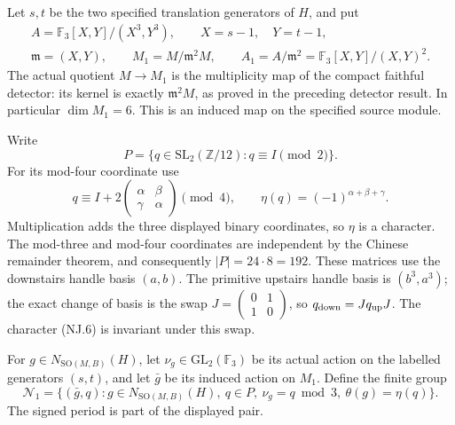 Let \(s,t\) be the two specified translation generators of \(H\), and put
\[
 \begin{gathered}
 A=\mathbb F_3[X,Y]/(X^3,Y^3),\qquad X=s-1,\quad Y=t-1,\\
 \mathfrak m=(X,Y),\qquad
 M_1=M/\mathfrak m^2M,\qquad
 A_1=A/\mathfrak m^2=\mathbb F_3[X,Y]/(X,Y)^2.
 \end{gathered}
 \tag{NJ.4}
\]
The actual quotient \(M\to M_1\) is the multiplicity map of
the compact faithful detector: its kernel is exactly
\(\mathfrak m^2M\), as proved in the preceding detector result.
In particular \(\dim M_1=6\). This is an induced map on the
specified source module.

Write
\[
 P=\{q\in\mathrm{SL}_2(\mathbb Z/12):q\equiv I\pmod2\}.
 \tag{NJ.5}
\]
For its mod-four coordinate use
\[
 q\equiv I+2\begin{pmatrix}\alpha&\beta\\\gamma&\alpha\end{pmatrix}
 \pmod4,\qquad
 \eta(q)=(-1)^{\alpha+\beta+\gamma}.
 \tag{NJ.6}
\]
Multiplication adds the three displayed binary coordinates, so
\(\eta\) is a character. The mod-three and mod-four coordinates
are independent by the Chinese remainder theorem, and consequently
\(|P|=24\cdot8=192\).
These matrices use the downstairs handle basis \((a,b)\).
The primitive upstairs handle basis is \((b^3,a^3)\); the exact
change of basis is the swap \(J=\left(\begin{smallmatrix}0&1\\1&0
\end{smallmatrix}\right)\), so \(q_{\rm down}=Jq_{\rm up}J\).
The character (NJ.6) is invariant under this swap.

For \(g\in N_{\mathrm{SO}(M,B)}(H)\), let
\(\nu_g\in\mathrm{GL}_2(\mathbb F_3)\) be its actual action on
the labelled generators \((s,t)\), and let \(\bar g\) be its
induced action on \(M_1\). Define the finite group
\[
 \mathcal N_1=
 \{(\bar g,q):g\in N_{\mathrm{SO}(M,B)}(H),\ q\in P,
       \ \nu_g=q\bmod3,\ \theta(g)=\eta(q)\}.
 \tag{NJ.7}
\]
The signed period is part of the displayed pair.

